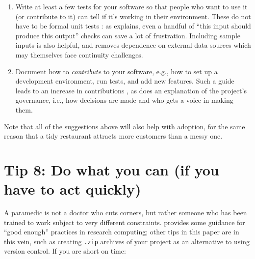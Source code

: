 \documentclass[10pt,letterpaper]{article}
\begin{document}
\begin{enumerate}
\item
  Write at least a few tests for your software
  so that people who want to use it (or contribute to it)
  can tell if it's working in their environment.
  These do not have to be formal unit tests \cite{Irving2021}:
  as \cite{Taschuk2017} explains,
  even a handful of ``this input should produce this output'' checks
  can save a lot of frustration.
  Including sample inputs is also helpful,
  and removes dependence on external data sources which may themselves face continuity challenges.

\item
  Document how to \emph{contribute} to your software,
  e.g.,
  how to set up a development environment,
  run tests,
  and add new features.
  Such a guide leads to an increase in contributions \cite{Sholler2019},
  as does an explanation of the project's governance,
  i.e.,
  how decisions are made and who gets a voice in making them.

\end{enumerate}

Note that all of the suggestions above will also help with adoption,
for the same reason that a tidy restaurant attracts more customers than a messy one.

\section*{Tip 8: Do what you can (if you have to act quickly)}

A paramedic is not a doctor who cuts corners,
but rather someone who has been trained to work subject to very different constraints.
\cite{Wilson2017} provides some guidance for ``good enough'' practices in research computing;
other tips in this paper are in this vein,
such as creating \texttt{.zip} archives of your project as an alternative to using version control.
If you are short on time:
\end{document}
